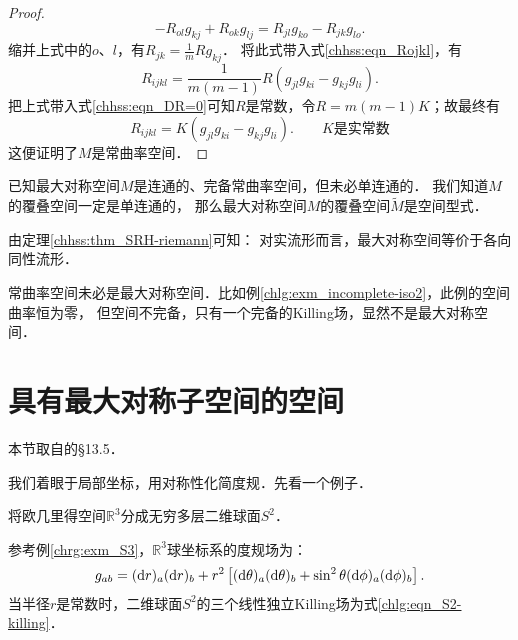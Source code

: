 \begin{proof}
    \begin{equation}
        -R_{ol} g_{kj} + R_{ok} g_{lj} = R_{jl} g_{ko}   - R_{jk} g_{lo} .
    \end{equation}
    缩并上式中的$o$、$l$，有$   R_{jk} = \frac{1}{m} R g_{kj} $．
    将此式带入式\eqref{chhss:eqn_Rojkl}，有
    \begin{equation}
        R_{ijkl} = \frac{1}{m(m-1)} R (g_{jl}  g_{ki}   -  g_{kj} g_{li}) .
    \end{equation}
    把上式带入式\eqref{chhss:eqn_DR=0}可知$R$是常数，令$R= m(m-1)K$；故最终有
    \begin{equation}
        R_{ijkl} = K  (g_{jl}  g_{ki}   -  g_{kj} g_{li}) .
        \qquad K\text{是实常数}
    \end{equation}
    这便证明了$M$是常曲率空间．
\end{proof}


已知最大对称空间$M$是连通的、完备常曲率空间，但未必单连通的．
我们知道$M$的覆叠空间一定是单连通的，
那么最大对称空间$M$的覆叠空间$\widetilde{M}$是空间型式．


由定理\ref{chhss:thm_SRH-riemann}可知：
对实流形而言，最大对称空间{\kaishu 等价于}各向同性流形．

常曲率空间未必是最大对称空间．比如例\ref{chlg:exm_incomplete-iso2}，此例的空间曲率恒为零，
但空间不完备，只有一个完备的Killing场，显然不是最大对称空间．





\section{具有最大对称子空间的空间}\label{chhss:sec_maxsymss}

本节取自\parencite{weinberg_grav-1972}的\S 13.5．

我们着眼于局部坐标，用对称性化简度规．先看一个例子．


\begin{example}\label{chhss:exm_sphere}
    将欧几里得空间$\mathbb{R}^3$分成无穷多层二维球面$S^2$．
\end{example}
参考例\ref{chrg:exm_S3}，$\mathbb{R}^3$球坐标系的度规场为：
\begin{equation}
    g_{ab}= ({\rm d}r)_a ({\rm d}r)_b 
    +r^2 \left[({\rm d}\theta)_a ({\rm d}\theta)_b
    +\sin^2\theta ({\rm d}\phi)_a ({\rm d}\phi)_b \right].
\end{equation}
当半径$r$是常数时，二维球面$S^2$的三个线性独立Killing场为式\eqref{chlg:eqn_S2-killing}．

